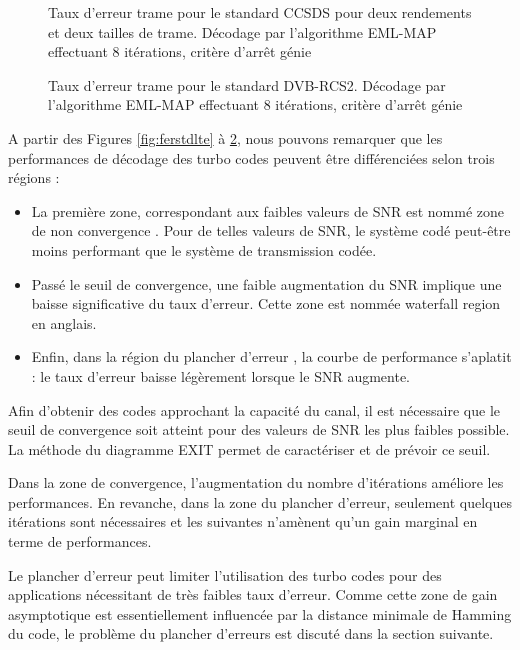 \begin{figure}[h]
\centering
				
		\caption{Taux d'erreur trame pour le standard CCSDS pour deux rendements et deux tailles de trame. 
		Décodage par l'algorithme EML-MAP effectuant 8 itérations, critère d’arrêt génie}
		\label{fig:ferstdCCSDS}
\end{figure}

\begin{figure}[h]
\centering
				
		\caption{Taux d'erreur trame pour le standard DVB-RCS2. Décodage par l'algorithme EML-MAP effectuant 
		8 itérations, critère d’arrêt génie}
		\label{fig:ferstdDVB2}
\end{figure}

\clearpage
A partir des Figures \ref{fig:ferstdlte} à \ref{fig:ferstdDVB2}, nous pouvons remarquer que les performances de décodage 
des turbo codes peuvent être différenciées selon trois régions :
\begin{itemize}
	\item La première zone, correspondant aux faibles valeurs de SNR est nommé \og zone de non convergence \fg. Pour de 
	telles valeurs de SNR, le système codé peut-être moins performant que le système de transmission codée.
	\item Passé le seuil de convergence, une faible augmentation du SNR implique une baisse significative du taux d'erreur. 
	Cette zone est nommée \og waterfall region \fg  en anglais.
	\item Enfin, dans la région du \og plancher d'erreur \fg, la courbe de performance s’aplatit : le taux d'erreur baisse 
	légèrement lorsque le SNR augmente.
\end{itemize}

Afin d'obtenir des codes approchant la capacité du canal, il est nécessaire que le seuil de convergence soit atteint pour des valeurs de SNR les plus faibles possible. La méthode du diagramme EXIT \cite{exitchart} permet de caractériser et de prévoir ce seuil. 

Dans la zone de convergence, l'augmentation du nombre d'itérations améliore les performances. En revanche, dans la zone 
du plancher d'erreur, seulement quelques itérations sont nécessaires et les suivantes n'amènent qu'un gain marginal en 
terme de performances.

Le plancher d'erreur peut limiter l'utilisation des turbo codes pour des applications nécessitant de très faibles taux 
d'erreur. Comme cette zone de gain asymptotique est essentiellement influencée par la distance minimale de Hamming du 
code, le problème du plancher d'erreurs est discuté dans la section suivante.

